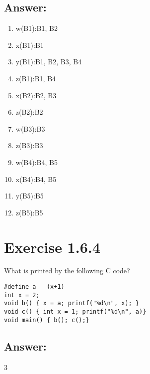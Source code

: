 \documentclass{article}
\begin{document}
\subsection{Answer:}
\begin{enumerate}
	\item w(B1):B1, B2
	\item x(B1):B1
	\item y(B1):B1, B2, B3, B4
	\item z(B1):B1, B4
	\item x(B2):B2, B3
	\item z(B2):B2
	\item w(B3):B3
	\item z(B3):B3
	\item w(B4):B4, B5
	\item x(B4):B4, B5
	\item y(B5):B5
	\item z(B5):B5
	
\end{enumerate}

\section{Exercise 1.6.4}
What is printed by the following C code?
\begin{lstlisting}[style=CStyle]
#define	a	(x+1)
int x = 2;
void b() { x = a; printf("%d\n", x); }
void c() { int x = 1; printf("%d\n", a)}
void main() { b(); c();}
\end{lstlisting}
\subsection{Answer:}
3
\end{document}
